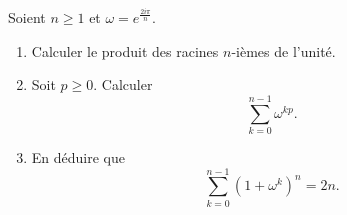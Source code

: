 Soient $n \geqslant 1$ et $\omega = e^{\frac{2i \pi}{n}}$.
\begin{enumerate}
\item Calculer le produit des racines $n$-ièmes de l'unité.
\item Soit $p \geqslant 0$. Calculer
\[ \sum_{k=0}^{n-1} \omega^{kp}.\]
\item En déduire que 
\[ \sum_{k=0}^{n-1} (1 + \omega^k)^n = 2n.\]
\end{enumerate}